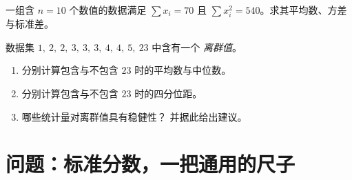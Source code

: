 \begin{exercise}[$\star\star$]\label{exo:g11:stat:9}
一组含 $n = 10$ 个数值的数据满足 $\sum x_i = 70$ 且
$\sum x_i^2 = 540$。求其平均数、方差与标准差。
\end{exercise}

\begin{exercise}[$\star\star\star$]\label{exo:g11:stat:10}
数据集 $1,\ 2,\ 2,\ 3,\ 3,\ 3,\ 4,\ 4,\ 5,\ 23$ 中含有一个
\emph{离群值}。
\begin{enumerate}
  \item 分别计算包含与不包含 $23$ 时的平均数与中位数。
  \item 分别计算包含与不包含 $23$ 时的四分位距。
  \item 哪些统计量对离群值具有稳健性？
        并据此给出建议。
\end{enumerate}
\end{exercise}

\section{问题：标准分数，一把通用的尺子}

